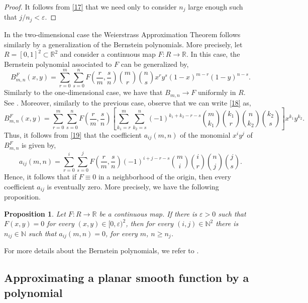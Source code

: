 \documentclass[11pt]{amsart}
\newtheorem{proposition}{Proposition}
\begin{document}
\begin{proof} It follows from \eqref{17} that we need only to consider $n_j$ large enough such that $j/n_j<\varepsilon$. \end{proof}

In the two-dimensional case the Weierstrass Approximation Theorem follows similarly by a generalization of the Bernstein polynomials. More precisely, let $R=[0,1]^2\subset\mathbb{R}^2$ and consider a continuous map $F\colon R\to\mathbb{R}$. In this case, the Bernstein polynomial associated to $F$ can be generalized by,
\begin{equation}\label{18}
	B_{m,n}^F(x,y)=\sum_{r=0}^{m}\sum_{s=0}^{n}F\left(\frac{r}{m},\frac{s}{n}\right)\binom{m}{r}\binom{n}{s}x^ry^s(1-x)^{m-r}(1-y)^{n-s}.
\end{equation}
Similarly to the one-dimensional case, we have that $B_{m,n}\to F$ uniformly in $R$. See \cite{HilSch1933}. Moreover, similarly to the previous case, observe that we can write \eqref{18} as,
\begin{equation}\label{19}
	B_{m,n}^F(x,y)=\sum_{r=0}^{m}\sum_{s=0}^{n}F\left(\frac{r}{m},\frac{s}{n}\right)\left[\sum_{k_1=r}^{m}\sum_{k_2=s}^{n}(-1)^{k_1+k_2-r-s}\binom{m}{k_1}\binom{k_1}{r}\binom{n}{k_2}\binom{k_2}{s}\right]x^{k_1}y^{k_2}.
\end{equation}	
Thus, it follows from \eqref{19} that the coefficient $a_{ij}(m,n)$ of the monomial $x^iy^j$ of $B_{m,n}^F$ is given by,
\begin{equation}\label{20}
	a_{ij}(m,n)=\sum_{r=0}^{i}\sum_{s=0}^{j}F\left(\frac{r}{m},\frac{s}{n}\right)(-1)^{i+j-r-s}\binom{m}{i}\binom{i}{r}\binom{n}{j}\binom{j}{s}.
\end{equation}
Hence, it follows that if $F\equiv0$ in a neighborhood of the origin, then every coefficient $a_{ij}$ is eventually zero. More precisely, we have the following proposition.

\begin{proposition}\label{P2}
	Let $F\colon R\to\mathbb{R}$ be a continuous map. If there is $\varepsilon>0$ such that $F(x,y)=0$ for every $(x,y)\in[0,\varepsilon)^2$, then for every $(i,j)\in\mathbb{N}^2$ there is $n_{ij}\in\mathbb{N}$ such that $a_{ij}(m,n)=0$, for every $m$, $n\geqslant n_j$.
\end{proposition}

For more details about the Bernstein polynomials, we refer to \cite{Lorentz}.

\subsection{Approximating a planar smooth function by a polynomial}\label{Sub3.3}
\end{document}
